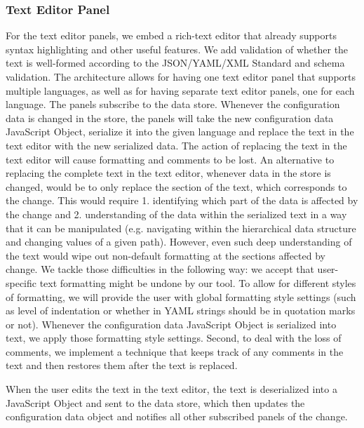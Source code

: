 \documentclass[lettersize,journal]{IEEEtran}
\begin{document}
\subsubsection{Text Editor Panel}
For the text editor panels, we embed a rich-text editor that already supports syntax highlighting and other useful features. We add validation of whether the text is well-formed according to the JSON/YAML/XML Standard and schema validation. 
The architecture allows for having one text editor panel that supports multiple languages, as well as for having separate text editor panels, one for each language.
The panels subscribe to the data store. Whenever the configuration data is changed in the store, the panels will take the new configuration data JavaScript Object, serialize it into the given language and replace the text in the text editor with the new serialized data.
The action of replacing the text in the text editor will cause formatting and comments to be lost. 
An alternative to replacing the complete text in the text editor, whenever data in the store is changed, would be to only replace the section of the text, which corresponds to the change. This would require 1. identifying which part of the data is affected by the change and 2. understanding of the data within the serialized text in a way that it can be manipulated (e.g. navigating within the hierarchical data structure and changing values of a given path). However, even such deep understanding of the text would wipe out non-default formatting at the sections affected by change. 
We tackle those difficulties in the following way: we accept that user-specific text formatting might be undone by our tool. To allow for different styles of formatting, we will provide the user with global formatting style settings (such as level of indentation or whether in YAML strings should be in quotation marks or not). Whenever the configuration data JavaScript Object is serialized into text, we apply those formatting style settings.
Second, to deal with the loss of comments, we implement a technique that keeps track of any comments in the text and then restores them after the text is replaced.

When the user edits the text in the text editor, the text is deserialized into a JavaScript Object and sent to the data store, which then updates the configuration data object and notifies all other subscribed panels of the change.

\end{document}
